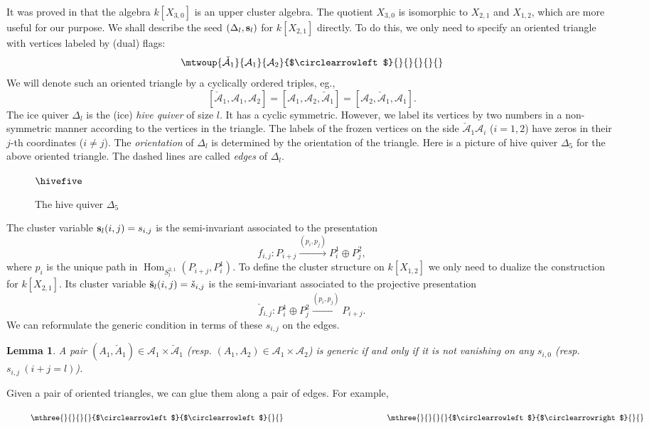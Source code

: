 \documentclass{amsart}
\newtheorem{lemma}[theorem]{Lemma}
\theoremstyle{definition}
\theoremstyle{remark}
\numberwithin{equation}{section}
\DeclareMathOperator{\Hom}{Hom}
\newcommand{\mc}[1]{\mathcal{#1}}
\newcommand{\mch}[1]{\check{\mathcal{#1}}}
\renewcommand{\b}[1]{\bold{#1}}
\begin{document}
It was proved in \cite{Fs1} that the algebra $k[X_{3,0}]$ is an upper cluster algebra.
The quotient $X_{3,0}$ is isomorphic to $X_{2,1}$ and $X_{1,2}$, which are more useful for our purpose.
We shall describe the seed $(\Delta_l,\b{s}_l)$ for $k[X_{2,1}]$ directly.
To do this, we only need to specify an oriented triangle with vertices labeled by (dual) flags:
$$\mtwoup{\mch{A}_1}{\mc{A}_1}{\mc{A}_2}{$\circlearrowleft$}{}{}{}{}{}$$
We will denote such an oriented triangle by a cyclically ordered triples, eg., $$[\mch{A}_1,\mc{A}_1,\mc{A}_2]=[\mc{A}_1,\mc{A}_2,\mch{A}_1]=[\mc{A}_2,\mch{A}_1,\mc{A}_1].$$
The ice quiver $\Delta_l$ is the (ice) {\em hive quiver} of size $l$.
It has a cyclic symmetric. However, we label its vertices by two numbers in a non-symmetric manner according to the vertices in the triangle.
The labels of the frozen vertices on the side $\mch{A}_1\mc{A}_i$ ($i=1,2$) have zeros in their $j$-th coordinates ($i\neq j$).
The {\em orientation} of $\Delta_l$ is determined by the orientation of the triangle.
Here is a picture of hive quiver $\Delta_5$ for the above oriented triangle.
The dashed lines are called {\em edges} of $\Delta_l$. 
\begin{figure}[!h] $\hivefive$ \caption{The hive quiver $\Delta_5$} \label{f:hive} \end{figure}
The cluster variable $\b{s}_l(i,j)=s_{i,j}$ is the semi-invariant associated to the presentation
$$f_{i,j}: P_{i+j} \xrightarrow{\left(p_{i}, p_{j}\right)} P_{i}^1\oplus P_{j}^2,$$
where $p_{i}$ is the unique path in $\Hom_{S_l^{2,1}}(P_{i+j},P_{i}^1)$.
To define the cluster structure on $k[X_{1,2}]$ we only need to dualize the construction for $k[X_{2,1}]$.
Its cluster variable $\check{\b{s}}_l(i,j)=\check{s}_{i,j}$ is the semi-invariant associated to the projective presentation
$$\check{f}_{i,j}: P_{i}^1\oplus P_{j}^2 \xrightarrow{\left(p_{i}, p_{j}\right)} P_{i+j}.$$
We can reformulate the generic condition in terms of these $s_{i,j}$ on the edges.

\begin{lemma} \label{L:generic-by-edge} A pair $(A_1,\check{A}_1)\in \mc{A}_1\times \mch{A}_1$ (resp. $(A_1,A_2)\in \mc{A}_1\times \mc{A}_2$) is generic if and only if it is not vanishing on any $s_{i,0}$ (resp. $s_{i,j}\ (i+j=l)$).
\end{lemma} 
 

Given a pair of oriented triangles, we can glue them along a pair of edges. For example,
\begin{figure}[!h] $\hspace{-0.1in} \mthree{}{}{}{}{$\circlearrowleft$}{$\circlearrowleft$}{}{} \hspace{1.8in} \mthree{}{}{}{}{$\circlearrowleft$}{$\circlearrowright$}{}{}$ \caption{} \label{f:pair} \end{figure} 
\end{document}
